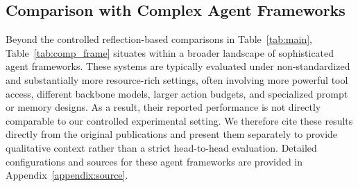 \subsection{Comparison with Complex Agent Frameworks}
Beyond the controlled reflection-based comparisons in Table~\ref{tab:main}, Table~\ref{tab:comp_frame} situates \method within a broader landscape of sophisticated agent frameworks. These systems are typically evaluated under non-standardized and substantially more resource-rich settings, often involving more powerful tool access, different backbone models, larger action budgets, and specialized prompt or memory designs.
As a result, their reported performance is not directly comparable to our controlled experimental setting. We therefore cite these results directly from the original publications and present them separately to provide qualitative context rather than a strict head-to-head evaluation. Detailed configurations and sources for these agent frameworks are provided in Appendix~\ref{appendix:source}.


\begin{table}[ht]
\vspace{-5pt}
\caption{Comparative results on the GAIA validation set between various agentic frameworks. Results are directly cited from their respective original reports or other sources.}
\label{tab:comp_frame}
\centering
{}
\vspace{-10pt}
\end{table}

